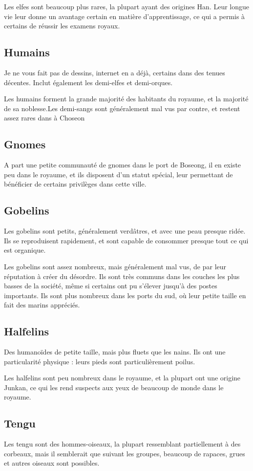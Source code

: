 \documentclass[10pt,a4paper]{book}
\newcommand{\nomroyaume}{Choseon}
\begin{document}
Les elfes sont beaucoup plus rares, la plupart ayant des origines Han. Leur longue vie leur donne un avantage certain en matière d'apprentissage, ce qui a permis à certains de réussir les examens royaux.
\subsection{Humains}
Je ne vous fait pas de dessins, internet en a déjà, certains dans des tenues décentes. Inclut également les demi-elfes et demi-orques.

Les humains forment la grande majorité des habitants du royaume, et la majorité de sa noblesse.Les demi-sangs sont généralement mal vus par contre, et restent assez rares dans à \nomroyaume
\subsection{Gnomes}
A part une petite communauté de gnomes dans le port de Boseong, il en existe peu dans le royaume, et ils disposent d'un statut spécial, leur permettant de bénéficier de certains privilèges dans cette ville.
\subsection{Gobelins}
Les gobelins sont petits, généralement verdâtres, et avec une peau presque ridée. Ils se reproduisent rapidement, et sont capable de consommer presque tout ce qui est organique.

Les gobelins sont assez nombreux, mais généralement mal vus, de par leur réputation à créer du désordre. Ils sont très communs dans les couches les plus basses de la société, même si certains ont pu s'élever jusqu'à des postes importants. Ils sont plus nombreux dans les ports du sud, où leur petite taille en fait des marins appréciés.
\subsection{Halfelins}
Des humanoïdes de petite taille, mais plus fluets que les nains. Ils ont une particularité physique : leurs pieds sont particulièrement poilus.

Les halfelins sont peu nombreux dans le royaume, et la plupart ont une origine Junkan, ce qui les rend suspects aux yeux de beaucoup de monde dans le royaume.
\subsection{Tengu}
Les tengu sont des hommes-oiseaux, la plupart ressemblant partiellement à des corbeaux, mais il semblerait que suivant les groupes, beaucoup de rapaces, grues et autres oiseaux sont possibles.
\end{document}
